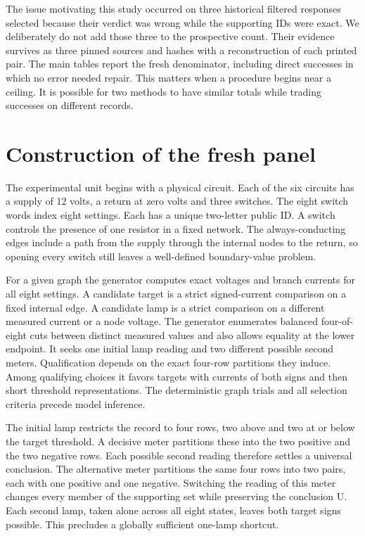 \documentclass[12pt,letterpaper]{article}
\begin{document}
The issue motivating this study occurred on three historical filtered responses selected because their verdict was wrong while the supporting IDs were exact. We deliberately do not add those three to the prospective count. Their evidence survives as three pinned sources and hashes with a reconstruction of each printed pair. The main tables report the fresh denominator, including direct successes in which no error needed repair. This matters when a procedure begins near a ceiling. It is possible for two methods to have similar totals while trading successes on different records.


\section{Construction of the fresh panel}
The experimental unit begins with a physical circuit. Each of the six circuits has a supply of 12 volts, a return at zero volts and three switches. The eight switch words index eight settings. Each has a unique two-letter public ID. A switch controls the presence of one resistor in a fixed network. The always-conducting edges include a path from the supply through the internal nodes to the return, so opening every switch still leaves a well-defined boundary-value problem.

For a given graph the generator computes exact voltages and branch currents for all eight settings. A candidate target is a strict signed-current comparison on a fixed internal edge. A candidate lamp is a strict comparison on a different measured current or a node voltage. The generator enumerates balanced four-of-eight cuts between distinct measured values and also allows equality at the lower endpoint. It seeks one initial lamp reading and two different possible second meters. Qualification depends on the exact four-row partitions they induce. Among qualifying choices it favors targets with currents of both signs and then short threshold representations. The deterministic graph trials and all selection criteria precede model inference.

The initial lamp restricts the record to four rows, two above and two at or below the target threshold. A decisive meter partitions these into the two positive and the two negative rows. Each possible second reading therefore settles a universal conclusion. The alternative meter partitions the same four rows into two pairs, each with one positive and one negative. Switching the reading of this meter changes every member of the supporting set while preserving the conclusion U. Each second lamp, taken alone across all eight states, leaves both target signs possible. This precludes a globally sufficient one-lamp shortcut.
\end{document}
